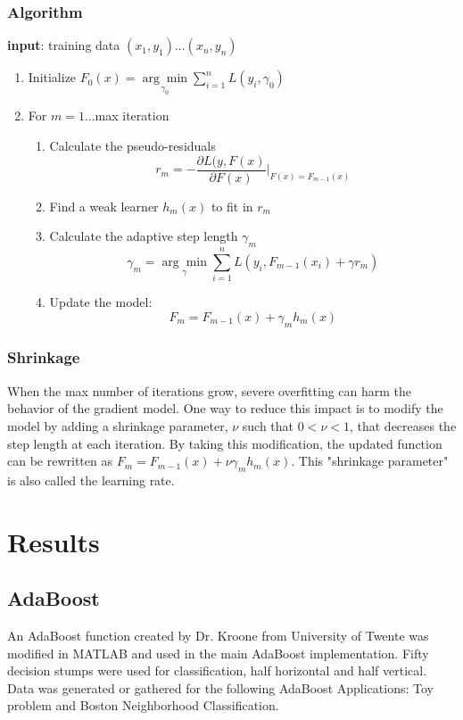 \documentclass[10pt,twocolumn,letterpaper]{article}
\begin{document}
\subsubsection{Algorithm}
\textbf{input}: training data ${(x_1,y_1)...(x_n,y_n)}$ 
\begin{enumerate}
\item Initialize  $F_0(x) = \underset{\gamma_0}{\arg\min} \sum_{i=1}^n L(y_i, \gamma_0)$
\item For $m=1$...max iteration
\begin{enumerate}
\item Calculate the pseudo-residuals
\begin{equation}
r_m = -\frac{\partial L(y,F(x)}{\partial F(x)} |_{F(x)=F_{m-1}(x)} 
\end{equation}
\item Find a weak learner $h_m(x)$ to fit in $r_m$
\item Calculate the adaptive step length $\gamma_m$
\begin{equation}
\gamma_m = \underset{\gamma}{\arg\min} \sum_{i=1}^n L(y_i,F_{m-1}(x_i)+\gamma r_m)
\end{equation}
\item Update the model:
\begin{equation}
F_m = F_{m-1}(x)+\gamma_m h_m(x)
\end{equation}

\end{enumerate}
\end{enumerate}
\subsubsection{Shrinkage}
When the max number of iterations grow, severe overfitting can harm the behavior of the gradient model. One way to reduce this impact is to modify the model by adding a shrinkage parameter, $\nu$ such that $0<\nu<1$, that decreases the step length at each iteration. By taking this modification, the updated function can be rewritten as $F_m = F_{m-1}(x)+\nu\gamma_m h_m(x)$. This "shrinkage parameter" is also called the learning rate.

\section{Results}
\subsection{AdaBoost}
An AdaBoost function created by Dr. Kroone from University of Twente was modified in MATLAB and used in the main AdaBoost implementation. Fifty decision stumps were used for classification, half horizontal and half vertical. Data was generated or gathered for the following AdaBoost Applications: Toy problem and Boston Neighborhood Classification. 
\end{document}
